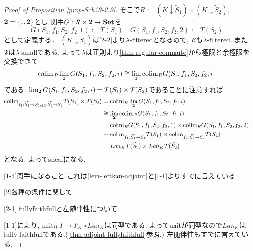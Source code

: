 \documentclass[dvipdfmx,a4paper,11pt]{report}
\newcommand{\colim}{{\rm colim}}
\theoremstyle{definition}
\begin{document}
\begin{proof}[Proof of Proposition \ref{prop-Sch19-2.9}]
そこで$R := (K \downarrow  \widetilde{S}_1) \times (K \downarrow  \widetilde{S}_2) $, ${\bf 2}=\{ 1,2\}$とし
関手$G : R \times {\bf 2} \to {\bf Set}$を
$$G(S_1, f_1, S_2, f_2, 1) := T(S_1)
\quad
G(S_1, f_1, S_2, f_2, 2) := T(S_2)
$$
として定義する．
$(K \downarrow  \widetilde{S}_1) $は[2-2]より$\lambda$-filteredとなるので, $R$も$\lambda$-filtered. 
また${\bf 2}$は$\lambda$-smallである. 
よって$\lambda$は正則より\ref{thm-regular-commute}から極限と余極限を交換できて
$$
\colim_{R} \lim_{{\bf2}}G(S_1, f_1, S_2, f_2, i)
\cong 
\lim_{{\bf2}}\colim_{R} G(S_1, f_1, S_2, f_2, i)
$$
である. 
$\lim_{{\bf2}}G(S_1, f_1, S_2, f_2, i) =T(S_1) \times T(S_2)$であることに注意すれば
\begin{align*}
\begin{split}
\colim_{f_1 : \widetilde{S_1} \to S_1,  f_2 : \widetilde{S_2} \to S_2} T(S_1) \times  T( S_2)
&=\colim_{R} \lim_{{\bf2}}G(S_1, f_1, S_2, f_2, i)\\
& \cong \lim_{{\bf2}}\colim_{R} G(S_1, f_1, S_2, f_2, i) \\
&= \colim_{R} G(S_1, f_1, S_2, f_2, 1)  \times \colim_{R} G(S_1, f_1, S_2, f_2, 2) \\
&=\colim_{f_1 : \widetilde{S_1} \to S_1 } T(S_1) \times  \colim_{ f_2 : \widetilde{S_2} \to S_2}T( S_2) \\
&= Lan_{K}T(\widetilde{S}_1) \times Lan_{K}T(\widetilde{S}_2) 
\end{split}
\end{align*}
となる. 
よってsheafになる. 

\underline{[1-4]関手になること } 
これは\ref{lem-leftkan-adjoint}と[1-1]よりすでに言えている. 

\vspace{5pt}
\underline{[2]各種の条件に関して}

\underline{[2-1] fullyfaithfullと左随伴性について}

[1-1]により, unit$\eta : I \to  F_{K} \circ Lan_{K} $は同型である. 
よってunitが同型なので$Lan_{K}$はfully faithfullである.(\ref{thm-adjoint-fullyfaithfull}参照.)
左随伴性もすでに言えている. 


\end{proof}
\end{document}
